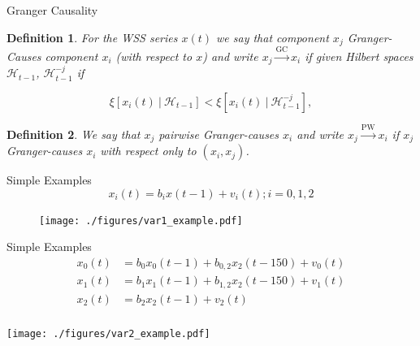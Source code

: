 \documentclass{beamer} %
\newtheorem*{defn}{Definition}
\def\gc{\overset{\text{GC}}{\rightarrow}}  %
\def\pwgc{\overset{\text{PW}}{\rightarrow}}  %
\def\H{\mathcal{H}}  %
\newcommand{\linEerr}[2]{\xi[#1\ |\ #2]}  %
\begin{document}
\begin{frame}{Granger Causality}
  \begin{defn}
    For the WSS series $x(t)$ we say that component $x_j$
    \textit{Granger-Causes} component $x_i$ (with respect to $x$)
    and write $x_j \gc x_i$ if given Hilbert spaces $\H_{t - 1}$,
    $\H^{-j}_{t - 1}$ if

    \begin{equation*}
      \linEerr{x_i(t)}{\H_{t - 1}} < \linEerr{x_i(t)}{\H^{-j}_{t - 1}},
    \end{equation*}
  \end{defn}\pause

  \begin{defn}
    We say that $x_j$ pairwise Granger-causes $x_i$ and write
    $x_j \pwgc x_i$ if $x_j$ Granger-causes $x_i$ with respect only to
    $(x_i, x_j)$.
  \end{defn}
\end{frame}

\begin{frame}{Simple Examples}
  \begin{equation*}
    x_i(t) = b_i x(t - 1) + v_i(t); i = 0, 1, 2
  \end{equation*}

  \begin{figure}
    \texttt{[image: ./figures/var1\_example.pdf]}
  \end{figure}
\end{frame}

\begin{frame}{Simple Examples}
  \begin{align*}
    x_0(t) &= b_0 x_0(t - 1) + b_{0, 2} x_2(t - 150) + v_0(t)\\
    x_1(t) &= b_1 x_1(t - 1) + b_{1, 2} x_2(t - 150) + v_1(t)\\
    x_2(t) &= b_2 x_2(t - 1) + v_2(t)\\
  \end{align*}


  \centering
  \texttt{[image: ./figures/var2\_example.pdf]}
\end{frame}
\end{document}
